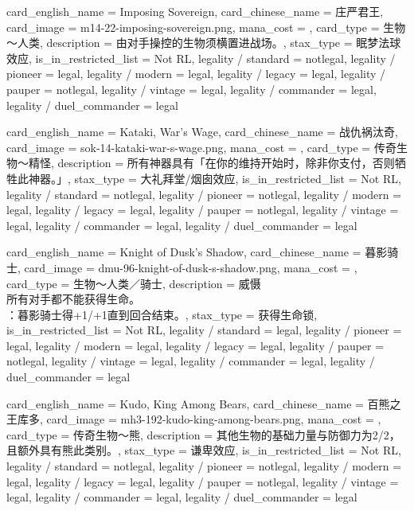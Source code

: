 \documentclass[lang = cn, color = black, 10pt]{AllThatStax}
\begin{document}
\card
{
	card_english_name = {Imposing Sovereign},
	card_chinese_name = {庄严君王},
	card_image = m14-22-imposing-sovereign.png,
	mana_cost = ,
	card_type = 生物～人类,
	description = {由对手操控的生物须横置进战场。},
	stax_type = 眠梦法球效应,
	is_in_restricted_list = Not RL,
	legality / standard = notlegal,
	legality / pioneer = legal,
	legality / modern = legal,
	legality / legacy = legal,
	legality / pauper = notlegal,
	legality / vintage = legal,
	legality / commander = legal,
	legality / duel_commander = legal
}

\card
{
	card_english_name = {Kataki, War's Wage},
	card_chinese_name = {战仇祸汰奇},
	card_image = sok-14-kataki-war-s-wage.png,
	mana_cost = ,
	card_type = 传奇生物～精怪,
	description = {所有神器具有「在你的维持开始时，除非你支付，否则牺牲此神器。」},
	stax_type = 大礼拜堂/烟囱效应,
	is_in_restricted_list = Not RL,
	legality / standard = notlegal,
	legality / pioneer = notlegal,
	legality / modern = legal,
	legality / legacy = legal,
	legality / pauper = notlegal,
	legality / vintage = legal,
	legality / commander = legal,
	legality / duel_commander = legal
}

\card
{
	card_english_name = {Knight of Dusk's Shadow},
	card_chinese_name = {暮影骑士},
	card_image = dmu-96-knight-of-dusk-s-shadow.png,
	mana_cost = ,
	card_type = 生物～人类／骑士,
	description = {威慑\\
所有对手都不能获得生命。\\
：暮影骑士得+1/+1直到回合结束。},
	stax_type = 获得生命锁,
	is_in_restricted_list = Not RL,
	legality / standard = legal,
	legality / pioneer = legal,
	legality / modern = legal,
	legality / legacy = legal,
	legality / pauper = notlegal,
	legality / vintage = legal,
	legality / commander = legal,
	legality / duel_commander = legal
}

\card
{
	card_english_name = {Kudo, King Among Bears},
	card_chinese_name = {百熊之王库多},
	card_image = mh3-192-kudo-king-among-bears.png,
	mana_cost = ,
	card_type = 传奇生物～熊,
	description = {其他生物的基础力量与防御力为2/2，且额外具有熊此类别。},
	stax_type = 谦卑效应,
	is_in_restricted_list = Not RL,
	legality / standard = notlegal,
	legality / pioneer = notlegal,
	legality / modern = legal,
	legality / legacy = legal,
	legality / pauper = notlegal,
	legality / vintage = legal,
	legality / commander = legal,
	legality / duel_commander = legal
}
\end{document}
